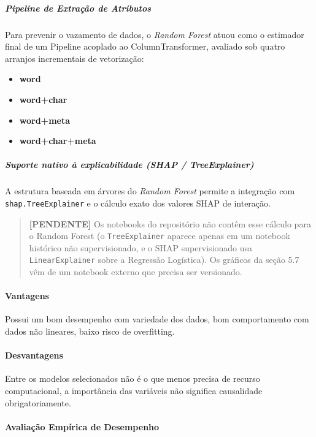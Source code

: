 \documentclass[
  brazilian,
  11pt,
]{article}
\providecommand{\tightlist}{%
  \setlength{\itemsep}{0pt}\setlength{\parskip}{0pt}}
\begin{document}
\subparagraph{Pipeline de Extração de Atributos}\label{pipeline-de-extrauxe7uxe3o-de-atributos-1}

Para prevenir o vazamento de dados, o \emph{Random Forest} atuou como o estimador final de um Pipeline acoplado ao ColumnTransformer, avaliado sob quatro arranjos incrementais de vetorização:

\begin{itemize}
\tightlist
\item
  \textbf{word}
\item
  \textbf{word+char}
\item
  \textbf{word+meta}
\item
  \textbf{word+char+meta}
\end{itemize}

\subparagraph{Suporte nativo à explicabilidade (SHAP / TreeExplainer)}\label{suporte-nativo-uxe0-explicabilidade-shap-treeexplainer}

A estrutura baseada em árvores do \emph{Random Forest} permite a integração com \texttt{shap.TreeExplainer} e o cálculo exato dos valores SHAP de interação.

\begin{quote}
\textbf{{[}PENDENTE{]}} Os notebooks do repositório não contêm esse cálculo para o Random Forest (o \texttt{TreeExplainer} aparece apenas em um notebook histórico não supervisionado, e o SHAP supervisionado usa \texttt{LinearExplainer} sobre a Regressão Logística). Os gráficos da seção 5.7 vêm de um notebook externo que precisa ser versionado.
\end{quote}

\paragraph{Vantagens}\label{vantagens-1}

Possui um bom desempenho com variedade dos dados, bom comportamento com dados não lineares, baixo risco de overfitting.

\paragraph{Desvantagens}\label{desvantagens-1}

Entre os modelos selecionados não é o que menos precisa de recurso computacional, a importância das variáveis não significa causalidade obrigatoriamente.

\paragraph{Avaliação Empírica de Desempenho}\label{avaliauxe7uxe3o-empuxedrica-de-desempenho-1}
\end{document}
